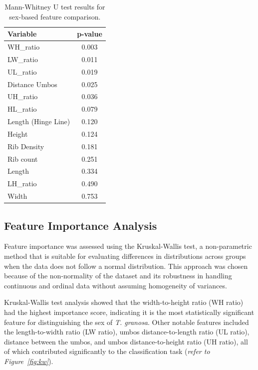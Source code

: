 \vspace{0.5cm}
\begin{table}[H]
	\centering
	\small %
	\begin{tabular}{lc}
		\hline
		\textbf{Variable} & \textbf{p-value} \\ \hline
		WH\_ratio & 0.003 \\
		LW\_ratio & 0.011 \\
		UL\_ratio & 0.019 \\
		Distance Umbos & 0.025 \\
		UH\_ratio & 0.036 \\
		HL\_ratio & 0.079 \\
		Length (Hinge Line) & 0.120 \\
		Height & 0.124 \\
		Rib Density & 0.181 \\
		Rib count & 0.251 \\
		Length & 0.334 \\
		LH\_ratio & 0.490 \\
		Width & 0.753 \\ \hline
		
	\end{tabular}
	
	\caption{Mann-Whitney U test results for sex-based feature comparison.}
	\label{tab:mann-whitney}
\end{table}

\newpage
\subsection{Feature Importance Analysis}

Feature importance was assessed using the Kruskal-Wallis test, a non-parametric method that is suitable for evaluating differences in distributions across groups when the data does not follow a normal distribution. This approach was chosen because of the non-normality of the dataset and its robustness in handling continuous and ordinal data without assuming homogeneity of variances. \cite{ribeiro2024}

Kruskal-Wallis test analysis showed that the width-to-height ratio (WH ratio) had the highest importance score, indicating it is the most statistically significant feature for distinguishing the sex of \textit{T. granosa}. Other notable features included the length-to-width ratio (LW ratio), umbos distance-to-length ratio (UL ratio), distance between the umbos, and umbos distance-to-height ratio (UH ratio), all of which contributed significantly to the classification task (\textit{refer to Figure~\ref{fig:kw}}).

